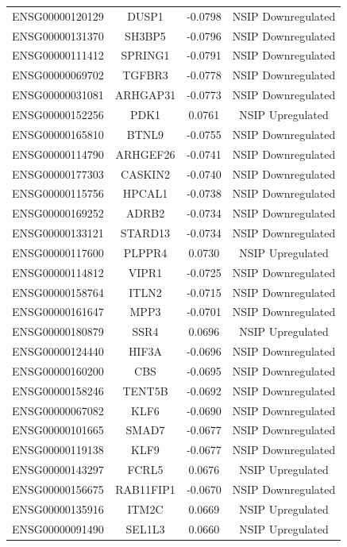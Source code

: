 \documentclass[
]{article}
\begin{document}
\begin{singlespace}
\begin{longtable}[t]{lccc}
ENSG00000120129 & DUSP1 & -0.0798 & NSIP Downregulated\\
ENSG00000131370 & SH3BP5 & -0.0796 & NSIP Downregulated\\
\addlinespace
ENSG00000111412 & SPRING1 & -0.0791 & NSIP Downregulated\\
ENSG00000069702 & TGFBR3 & -0.0778 & NSIP Downregulated\\
ENSG00000031081 & ARHGAP31 & -0.0773 & NSIP Downregulated\\
ENSG00000152256 & PDK1 & 0.0761 & NSIP Upregulated\\
ENSG00000165810 & BTNL9 & -0.0755 & NSIP Downregulated\\
\addlinespace
ENSG00000114790 & ARHGEF26 & -0.0741 & NSIP Downregulated\\
ENSG00000177303 & CASKIN2 & -0.0740 & NSIP Downregulated\\
ENSG00000115756 & HPCAL1 & -0.0738 & NSIP Downregulated\\
ENSG00000169252 & ADRB2 & -0.0734 & NSIP Downregulated\\
ENSG00000133121 & STARD13 & -0.0734 & NSIP Downregulated\\
\addlinespace
ENSG00000117600 & PLPPR4 & 0.0730 & NSIP Upregulated\\
ENSG00000114812 & VIPR1 & -0.0725 & NSIP Downregulated\\
ENSG00000158764 & ITLN2 & -0.0715 & NSIP Downregulated\\
ENSG00000161647 & MPP3 & -0.0701 & NSIP Downregulated\\
ENSG00000180879 & SSR4 & 0.0696 & NSIP Upregulated\\
\addlinespace
ENSG00000124440 & HIF3A & -0.0696 & NSIP Downregulated\\
ENSG00000160200 & CBS & -0.0695 & NSIP Downregulated\\
ENSG00000158246 & TENT5B & -0.0692 & NSIP Downregulated\\
ENSG00000067082 & KLF6 & -0.0690 & NSIP Downregulated\\
ENSG00000101665 & SMAD7 & -0.0677 & NSIP Downregulated\\
\addlinespace
ENSG00000119138 & KLF9 & -0.0677 & NSIP Downregulated\\
ENSG00000143297 & FCRL5 & 0.0676 & NSIP Upregulated\\
ENSG00000156675 & RAB11FIP1 & -0.0670 & NSIP Downregulated\\
ENSG00000135916 & ITM2C & 0.0669 & NSIP Upregulated\\
ENSG00000091490 & SEL1L3 & 0.0660 & NSIP Upregulated\\

\end{longtable}
\end{singlespace}
\end{document}
